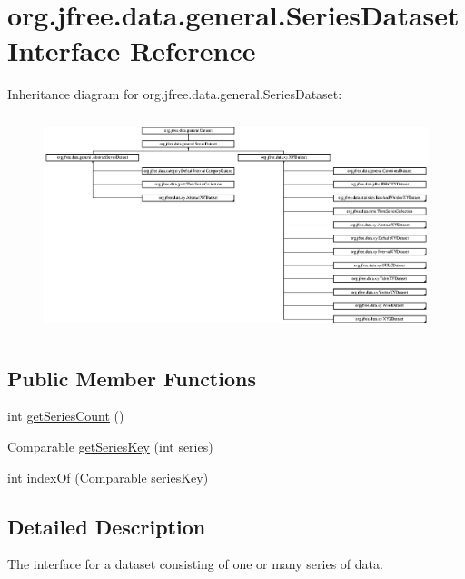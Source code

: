 \hypertarget{interfaceorg_1_1jfree_1_1data_1_1general_1_1_series_dataset}{}\section{org.\+jfree.\+data.\+general.\+Series\+Dataset Interface Reference}
\label{interfaceorg_1_1jfree_1_1data_1_1general_1_1_series_dataset}
Inheritance diagram for org.\+jfree.\+data.\+general.\+Series\+Dataset\+:\begin{figure}[H]
\begin{center}
\leavevmode
\includegraphics[height=6.344411cm]{interfaceorg_1_1jfree_1_1data_1_1general_1_1_series_dataset}
\end{center}
\end{figure}
\subsection*{Public Member Functions}
\begin{DoxyCompactItemize}
\item 
int \mbox{\hyperlink{interfaceorg_1_1jfree_1_1data_1_1general_1_1_series_dataset_a84fe822f5918f941d9de1ed1b73c9f58}{get\+Series\+Count}} ()
\item 
Comparable \mbox{\hyperlink{interfaceorg_1_1jfree_1_1data_1_1general_1_1_series_dataset_a60488892b2314a05a012999e26a74178}{get\+Series\+Key}} (int series)
\item 
int \mbox{\hyperlink{interfaceorg_1_1jfree_1_1data_1_1general_1_1_series_dataset_a8995ed4d70a6c4efe3a4f23318e47046}{index\+Of}} (Comparable series\+Key)
\end{DoxyCompactItemize}


\subsection{Detailed Description}
The interface for a dataset consisting of one or many series of data.

